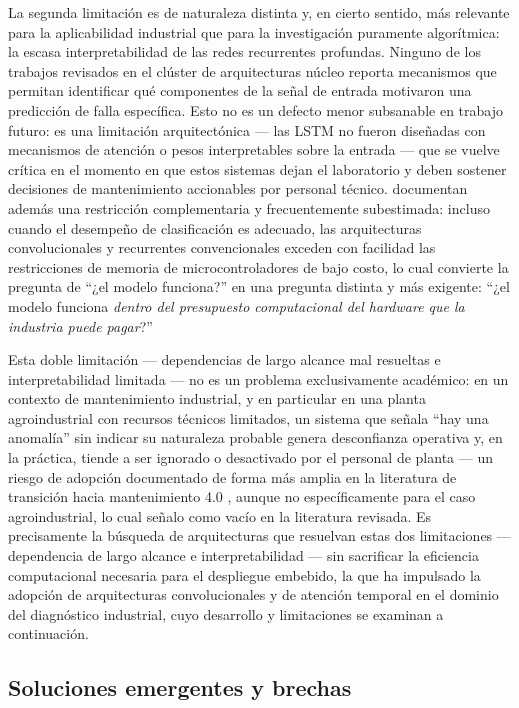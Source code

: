 \documentclass[11pt]{article}
\begin{document}
La segunda limitación es de naturaleza distinta y, en cierto sentido, más relevante para la aplicabilidad industrial que para la investigación puramente algorítmica: la escasa interpretabilidad de las redes recurrentes profundas. Ninguno de los trabajos revisados en el clúster de arquitecturas núcleo reporta mecanismos que permitan identificar qué componentes de la señal de entrada motivaron una predicción de falla específica. Esto no es un defecto menor subsanable en trabajo futuro: es una limitación arquitectónica --- las LSTM no fueron diseñadas con mecanismos de atención o pesos interpretables sobre la entrada --- que se vuelve crítica en el momento en que estos sistemas dejan el laboratorio y deben sostener decisiones de mantenimiento accionables por personal técnico. \citet{pham2020} documentan además una restricción complementaria y frecuentemente subestimada: incluso cuando el desempeño de clasificación es adecuado, las arquitecturas convolucionales y recurrentes convencionales exceden con facilidad las restricciones de memoria de microcontroladores de bajo costo, lo cual convierte la pregunta de ``¿el modelo funciona?'' en una pregunta distinta y más exigente: ``¿el modelo funciona \textit{dentro del presupuesto computacional del hardware que la industria puede pagar}?''

Esta doble limitación --- dependencias de largo alcance mal resueltas e interpretabilidad limitada --- no es un problema exclusivamente académico: en un contexto de mantenimiento industrial, y en particular en una planta agroindustrial con recursos técnicos limitados, un sistema que señala ``hay una anomalía'' sin indicar su naturaleza probable genera desconfianza operativa y, en la práctica, tiende a ser ignorado o desactivado por el personal de planta --- un riesgo de adopción documentado de forma más amplia en la literatura de transición hacia mantenimiento 4.0 \citep{achouch2022}, aunque no específicamente para el caso agroindustrial, lo cual señalo como vacío en la literatura revisada. Es precisamente la búsqueda de arquitecturas que resuelvan estas dos limitaciones --- dependencia de largo alcance e interpretabilidad --- sin sacrificar la eficiencia computacional necesaria para el despliegue embebido, la que ha impulsado la adopción de arquitecturas convolucionales y de atención temporal en el dominio del diagnóstico industrial, cuyo desarrollo y limitaciones se examinan a continuación.

\subsection{Soluciones emergentes y brechas}
\label{sec:soluciones-emergentes}
\end{document}
